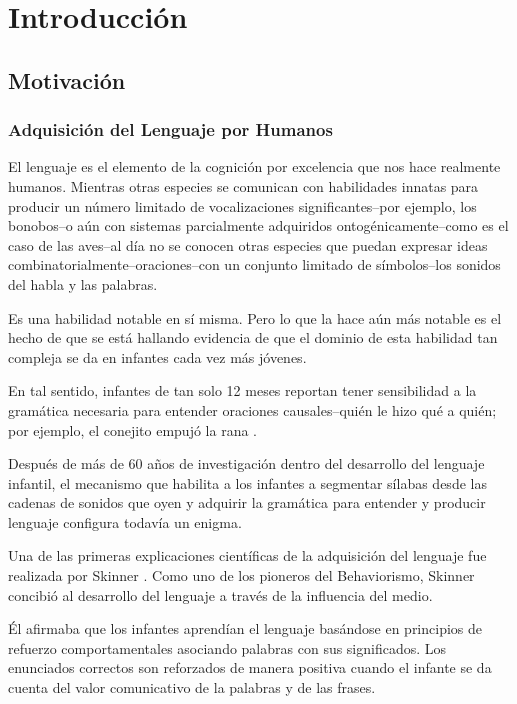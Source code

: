 \chapter{Introducción}

\section{Motivación}

\subsection{Adquisición del Lenguaje por Humanos}

El lenguaje es el elemento de la cognición por excelencia que nos hace realmente humanos.
Mientras otras especies se comunican con habilidades innatas para producir un número limitado de vocalizaciones significantes--por ejemplo, los bonobos--o aún con sistemas parcialmente adquiridos ontogénicamente--como es el caso de las aves--al día no se conocen otras especies que puedan expresar ideas combinatorialmente--oraciones--con un conjunto limitado de símbolos--los sonidos del habla y las palabras.

Es una habilidad notable en sí misma. Pero lo que la hace aún más notable es el hecho de que se está hallando evidencia de que el dominio de esta habilidad tan compleja se da en infantes cada vez más jóvenes.

En tal sentido, infantes de tan solo 12 meses reportan tener sensibilidad a la gramática necesaria para entender oraciones causales--quién le hizo qué a quién; por ejemplo, el conejito empujó la rana \cite{doi:10.1080/15475441003769411}.

Después de más de 60 años de investigación dentro del desarrollo del lenguaje infantil, el mecanismo que habilita a los infantes a segmentar sílabas desde las cadenas de sonidos que oyen y adquirir la gramática para entender y producir lenguaje configura todavía un enigma.

Una de las primeras explicaciones científicas de la adquisición del lenguaje fue realizada por Skinner \cite{skinner1957verbal}.
Como uno de los pioneros del Behaviorismo, Skinner concibió al desarrollo del lenguaje a través de la influencia del medio.

Él afirmaba que los infantes aprendían el lenguaje basándose en principios de refuerzo comportamentales asociando palabras con sus significados.
Los enunciados correctos son reforzados de manera positiva cuando el infante se da cuenta del valor comunicativo de la palabras y de las frases.

